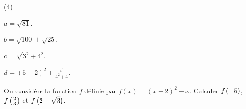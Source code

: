 \begin{act}
\begin{itemize-}[after-skip=\truc](4)
\item $a=\sqrt{81}$.
\item $b=\sqrt{100}+\sqrt{25}$.
\item $c=\sqrt{3^2+4^2}$.
\item $d=(5-2)^2+\frac{4^3}{4^2+4}$.
\end{itemize-}
\end{act}
%
%
%
\begin{act}On considère la fonction $f$ définie par $f(x)=(x+2)^2-x$. %
Calculer $f\,\mleft(-5\mright)$, $f\,\mleft(\frac23\mright)$ et $f\,\mleft(2-\sqrt{3}\mright)$.
\end{act}

